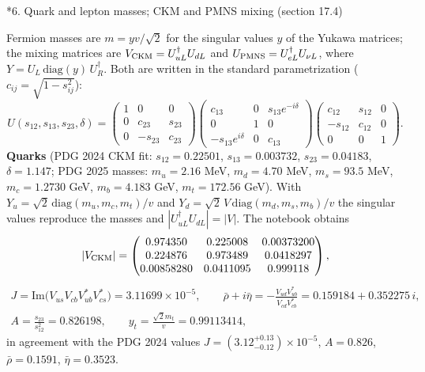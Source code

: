 \documentclass[10pt,a4paper]{article}
\makeatletter
\renewcommand\section{\@startsection{section}{1}{\z@}{-3.5ex \@plus -1ex \@minus -.2ex}{2.3ex \@plus.2ex}{\normalfont\Large\bfseries\raggedright}}
\makeatother
\begin{document}
\section*{6. Quark and lepton masses; CKM and PMNS mixing (section 17.4)}
Fermion masses are $m=yv/\sqrt2$ for the singular values $y$ of the Yukawa matrices; the mixing matrices are $V_{\rm CKM}=U_{uL}^\dagger U_{dL}$ and $U_{\rm PMNS}=U_{eL}^\dagger U_{\nu L}$, where $Y=U_L\,\mathrm{diag}(y)\,U_R^\dagger$. Both are written in the standard parametrization ($c_{ij}=\sqrt{1-s_{ij}^2}$):
\begin{equation*}
U(s_{12},s_{13},s_{23},\delta)=\begin{pmatrix}1&0&0\\0&c_{23}&s_{23}\\0&-s_{23}&c_{23}\end{pmatrix}\begin{pmatrix}c_{13}&0&s_{13}e^{-i\delta}\\0&1&0\\-s_{13}e^{i\delta}&0&c_{13}\end{pmatrix}\begin{pmatrix}c_{12}&s_{12}&0\\-s_{12}&c_{12}&0\\0&0&1\end{pmatrix}.
\end{equation*}
\textbf{Quarks} (PDG 2024 CKM fit: $s_{12}=0.22501$, $s_{13}=0.003732$, $s_{23}=0.04183$, $\delta=1.147$; PDG 2025 masses: $m_u=2.16$ MeV, $m_d=4.70$ MeV, $m_s=93.5$ MeV, $m_c=1.2730$ GeV, $m_b=4.183$ GeV, $m_t=172.56$ GeV). With $Y_u=\sqrt2\,\mathrm{diag}(m_u,m_c,m_t)/v$ and $Y_d=\sqrt2\,V\,\mathrm{diag}(m_d,m_s,m_b)/v$ the singular values reproduce the masses and $|U_{uL}^\dagger U_{dL}|=|V|$. The notebook obtains
\begin{equation*}
|V_{\rm CKM}|=\begin{pmatrix}0.974350&0.225008&0.00373200\\0.224876&0.973489&0.0418297\\0.00858280&0.0411095&0.999118\end{pmatrix},
\end{equation*}
\begin{gather*}
J=\mathrm{Im}\big(V_{us}V_{cb}V_{ub}^*V_{cs}^*\big)=3.11699\times10^{-5},\qquad \bar\rho+i\bar\eta=-\frac{V_{ud}V_{ub}^*}{V_{cd}V_{cb}^*}=0.159184+0.352275\,i,\\ A=\frac{s_{23}}{s_{12}^2}=0.826198,\qquad y_t=\frac{\sqrt2m_t}{v}=0.99113414,
\end{gather*}
in agreement with the PDG 2024 values $J=(3.12^{+0.13}_{-0.12})\times10^{-5}$, $A=0.826$, $\bar\rho=0.1591$, $\bar\eta=0.3523$.
\end{document}

